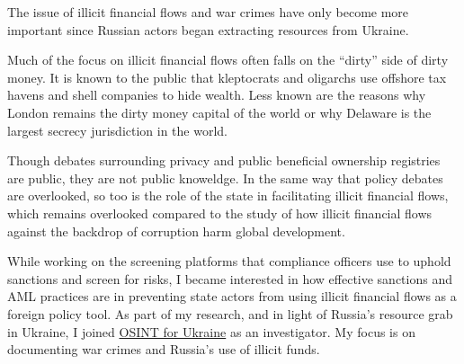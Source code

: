 The issue of illicit financial flows and war crimes have only become
more important since Russian actors began extracting resources from
Ukraine.

Much of the focus on illicit financial flows often falls on the
``dirty'' side of dirty money. It is known to the public that
kleptocrats and oligarchs use offshore tax havens and shell companies to
hide wealth. Less known are the reasons why London remains the dirty
money capital of the world or why Delaware is the largest secrecy
jurisdiction in the world.

Though debates surrounding privacy and public beneficial ownership
registries are public, they are not public knoweldge. In the same way
that policy debates are overlooked, so too is the role of the state in
facilitating illicit financial flows, which remains overlooked compared
to the study of how illicit financial flows against the backdrop of
corruption harm global development.

While working on the screening platforms that compliance officers use to
uphold sanctions and screen for risks, I became interested in how
effective sanctions and AML practices are in preventing state actors
from using illicit financial flows as a foreign policy tool. As part of
my research, and in light of Russia's resource grab in Ukraine, I joined
\href{https://www.osintforukraine.com/}{OSINT for Ukraine} as an
investigator. My focus is on documenting war crimes and Russia's use of
illicit funds.

